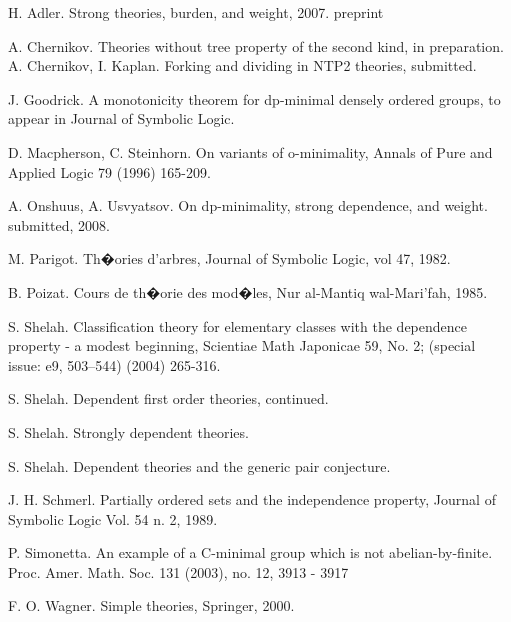 \documentclass[english]{article}
\theoremstyle{definition}
\theoremstyle{mystyle}
\theoremstyle{remark}
\begin{document}
\begin{thebibliography}{9999999}

 H. Adler. Strong theories, burden, and weight, 2007. preprint

 A. Chernikov. Theories without tree property of the second kind, in preparation.
 A. Chernikov, I. Kaplan. Forking and dividing in NTP2 theories, submitted.

 J. Goodrick. A monotonicity theorem for dp-minimal densely ordered groups, to appear in Journal of Symbolic Logic.

  D. Macpherson, C. Steinhorn. On variants of o-minimality, Annals of Pure and Applied Logic 79 (1996) 165-209.

 A. Onshuus, A. Usvyatsov. On dp-minimality, strong dependence, and weight. submitted, 2008.

 M. Parigot. Th�ories d'arbres, Journal of Symbolic Logic, vol 47, 1982.

 B. Poizat. Cours de th�orie des mod�les, Nur al-Mantiq wal-Mari'fah, 1985.

 S. Shelah. Classification theory for elementary classes with the dependence property - a modest beginning, Scientiae Math Japonicae 59, No. 2; (special issue: e9, 503--544) (2004) 265-316.

 S. Shelah. Dependent first order theories, continued.

 S. Shelah. Strongly dependent theories.

 S. Shelah. Dependent theories and the generic pair conjecture.

 J. H. Schmerl. Partially ordered sets and the independence property, Journal of Symbolic Logic Vol. 54 n. 2, 1989.

 P. Simonetta. An example of a C-minimal group which is not abelian-by-finite. Proc. Amer. Math. Soc. 131 (2003), no. 12, 3913 - 3917

 F. O. Wagner. Simple theories, Springer, 2000.
\end{thebibliography}
\end{document}
